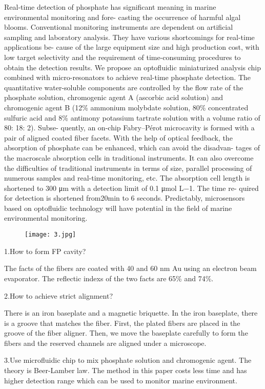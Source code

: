 \documentclass{article}
\begin{document}
Real-time detection of phosphate has significant meaning in marine environmental monitoring and fore- casting the occurrence of harmful algal blooms. Conventional monitoring instruments are dependent on artificial sampling and laboratory analysis. They have various shortcomings for real-time applications be- cause of the large equipment size and high production cost, with low target selectivity and the requirement of time-consuming procedures to obtain the detection results. We propose an optofluidic miniaturized analysis chip combined with micro-resonators to achieve real-time phosphate detection. The quantitative water-soluble components are controlled by the flow rate of the phosphate solution, chromogenic agent A (ascorbic acid solution) and chromogenic agent B (12\% ammonium molybdate solution, 80\% concentrated sulfuric acid and 8\% antimony potassium tartrate solution with a volume ratio of 80: 18: 2). Subse- quently, an on-chip Fabry–Pérot microcavity is formed with a pair of aligned coated fiber facets. With the help of optical feedback, the absorption of phosphate can be enhanced, which can avoid the disadvan- tages of the macroscale absorption cells in traditional instruments. It can also overcome the difficulties of traditional instruments in terms of size, parallel processing of numerous samples and real-time monitoring, etc. The absorption cell length is shortened to 300 μm with a detection limit of 0.1 μmol L−1. The time re- quired for detection is shortened from20min to 6 seconds. Predictably, microsensors based on optofluidic technology will have potential in the field of marine environmental monitoring.

\begin{figure}[H]
\centering
\texttt{[image: 3.jpg]}
\end{figure}

1.How to form FP cavity?

The facts of the fibers are coated with 40 and 60 nm Au using an electron beam evaporator. The reflectic indexs of the two facts are 65\% and 74\%.


2.How to achieve strict alignment?

There is an iron baseplate and a magnetic briquette. In the iron baseplate, there is a groove that matches the fiber. First, the plated fibers are placed in the groove of the fiber aligner. Then, we move the baseplate carefully to form the fibers and the reserved channels are aligned under a microscope.


3.Use microfluidic chip to mix phosphate solution and chromogenic agent. The theory is Beer-Lamber law. The method in this paper costs less time and has higher detection range which can be used to monitor marine environment.
\end{document}
